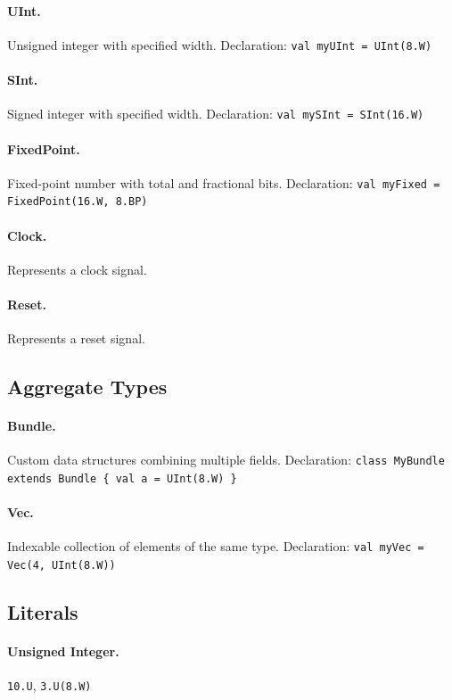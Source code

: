 \paragraph{UInt.} Unsigned integer with specified width. Declaration: \texttt{val myUInt = UInt(8.W)}

\paragraph{SInt.} Signed integer with specified width. Declaration: \texttt{val mySInt = SInt(16.W)}

\paragraph{FixedPoint.} Fixed-point number with total and fractional bits. Declaration: \texttt{val myFixed = FixedPoint(16.W, 8.BP)}

\paragraph{Clock.} Represents a clock signal.

\paragraph{Reset.} Represents a reset signal.

\subsection{Aggregate Types}
\paragraph{Bundle.} Custom data structures combining multiple fields. Declaration: \texttt{class MyBundle extends Bundle \{ val a = UInt(8.W) \}}

\paragraph{Vec.} Indexable collection of elements of the same type. Declaration: \texttt{val myVec = Vec(4, UInt(8.W))}

\subsection{Literals} 
\paragraph{Unsigned Integer.}  \texttt{10.U}, \texttt{3.U(8.W)}

